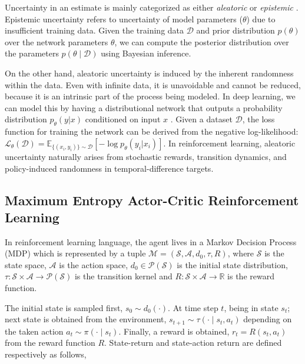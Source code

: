\documentclass[10pt]{article} %
\begin{document}
Uncertainty in an estimate is mainly categorized as either \textit{aleatoric} or \textit{epistemic}  \citep{der2009aleatory, kendall2017uncertainties, gal2016uncertainty}. Epistemic uncertainty refers to uncertainty of model parameters ($\theta$) due to insufficient training data. Given the training data $\mathcal{D}$ and prior distribution $p(\theta)$ over the network parameters $\theta$, we can compute the posterior distribution over the parameters $p(\theta \mid \mathcal{D})$ using Bayesian inference. 

On the other hand, aleatoric uncertainty is induced by the inherent randomness within the data. Even with infinite data, it is unavoidable and cannot be reduced, because it is an intrinsic part of the process being modeled. In deep learning, we can model this by having a distributional network that outputs a probability distribution $p_{\theta}(y|x)$ conditioned on input $x$ \citep{lakshminarayanan2017simple, kendall2017uncertainties}. Given a dataset $\mathcal{D}$, the loss function for training the network can be derived from the negative log-likelihood: $\mathcal{L}_{\theta}(\mathcal{D}) = \mathbb{E}_{\{(x_i, y_i)\} \sim \mathcal{D}} [ -\log{p_{\theta}(y_i|x_i)} ] $. In reinforcement learning, aleatoric uncertainty naturally arises from stochastic rewards, transition dynamics, and policy-induced randomness in temporal-difference targets. 

\subsection{Maximum Entropy Actor-Critic Reinforcement Learning}

In reinforcement learning language, the agent lives in a Markov Decision Process (MDP) which is represented by a tuple $\mathcal{M} = (\mathcal{S}, \mathcal{A}, d_0, \tau, R)$, where $\mathcal{S}$ is the state space, $\mathcal{A}$ is the action space, $d_0 \in \mathcal{P}(\mathcal{S})$ is the initial state distribution, $\tau: \mathcal{S}\times\mathcal{A} \rightarrow \mathcal{P}(\mathcal{S})$ is the transition kernel and $R: \mathcal{S}\times\mathcal{A} \rightarrow \mathbb{R}$ is the reward function. 

The initial state is sampled first, $s_0 \sim d_0(\cdot)$. At time step $t$, being in state $s_t$; next state is obtained from the environment, $s_{t+1} \sim \tau(\cdot \mid s_t,a_t)$ depending on the taken action $a_t \sim \pi(\cdot \mid s_t)$. Finally, a reward is obtained, $r_t=R(s_t, a_t)$ from the reward function $R$. State-return and state-action return are defined respectively as follows,
\end{document}
